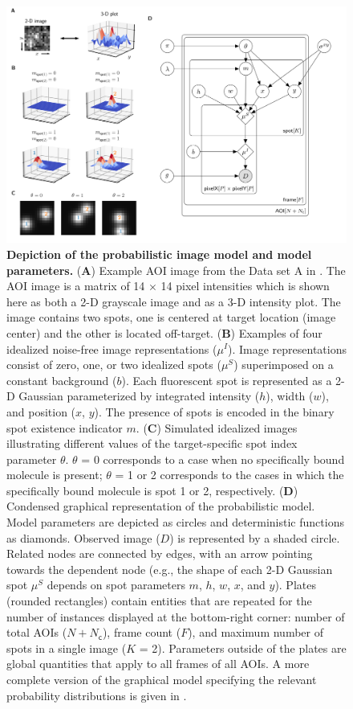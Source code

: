 \begin{figure}
\begin{fullwidth}
\includegraphics[width=183mm]{figures/graphical_model.png}
\caption{\textbf{Depiction of the probabilistic image model and model parameters.} (\textbf{A}) Example AOI image from the Data set A in . The AOI image is a matrix of 14 $\times$ 14 pixel intensities which is shown here as both a 2-D grayscale image and as a 3-D intensity plot. The image contains two spots, one is centered at target location (image center) and the other is located off-target. (\textbf{B}) Examples of four idealized noise-free image representations ($\mu^I$). Image representations consist of zero, one, or two idealized spots ($\mu^S$) superimposed on a constant background ($b$). Each fluorescent spot is represented as a 2-D Gaussian parameterized by integrated intensity ($h$), width ($w$), and position ($x$, $y$). The presence of spots is encoded in the binary spot existence indicator $m$. (\textbf{C}) Simulated idealized images illustrating different values of the target-specific spot index parameter $\theta$. $\theta$ = 0 corresponds to a case when no specifically bound molecule is present; $\theta$ = 1 or 2 corresponds to the cases in which the specifically bound molecule is spot 1 or 2, respectively. (\textbf{D}) Condensed graphical representation of the probabilistic model. Model parameters are depicted as circles and deterministic functions as diamonds. Observed image ($D$) is represented by a shaded circle. Related nodes are connected by edges, with an arrow pointing towards the dependent node (e.g., the shape of each 2-D Gaussian spot $\mu^S$ depends on spot parameters $m$, $h$, $w$, $x$, and $y$). Plates (rounded rectangles) contain entities that are repeated for the number of instances displayed at the bottom-right corner: number of total AOIs ($N+N_\mathsf{c}$), frame count ($F$), and maximum number of spots in a single image ($K$ = 2). Parameters outside of the plates are global quantities that apply to all frames of all AOIs. A more complete version of the graphical model specifying the relevant probability distributions is given in . }

\end{fullwidth}
\end{figure}
